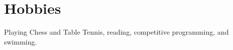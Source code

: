 \documentclass[]{resume}
\begin{document}
\begin{minipage}[t]{0.5\textwidth}





    \section{Hobbies}
    Playing Chess and Table Tennis, reading, competitive programming, and swimming.


\end{minipage}
\end{document}
